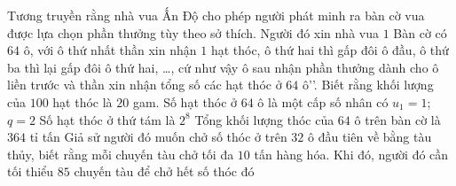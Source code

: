 \begin{ex}%
	Tương truyền rằng nhà vua Ấn Độ cho phép người phát minh ra bàn cờ vua được lựa chọn phần thưởng tùy theo sở thích. Người đó xin nhà vua $1$ Bàn cờ có $64$ ô, với ô thứ nhất thần xin nhận $1$ hạt thóc, ô thứ hai thì gấp đôi ô đầu, ô thứ  ba thì lại gấp đôi ô thứ hai, \ldots, cứ như vậy ô sau nhận phần thưởng dành cho ô liền trước và thần xin nhận tổng số các hạt thóc ở $64$ ô\rq\rq. Biết rằng khối lượng của $100$ hạt thóc là $20$ gam.
	\choiceTF 
		{\True Số hạt thóc ở $64$ ô là  một cấp số nhân có $u_1=1$; $q=2$}
		{Số hạt  thóc ở thứ tám là $2^8$}
		{Tổng khối lượng thóc của $64$ ô trên  bàn cờ là $364$ tỉ tấn}
		{Giả sử người đó muốn chở số thóc ở trên $32$ ô đầu tiên về bằng tàu thủy, biết rằng mỗi chuyến tàu chở tối đa $10$ tấn hàng hóa. Khi đó,  người đó cần tối thiểu $85$ chuyến tàu để chở hết số thóc đó}
\end{ex}

